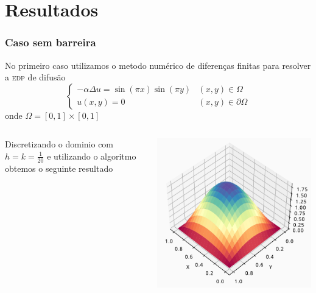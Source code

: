 \documentclass[xcolor=dvipsnames, aspectratio=169]{beamer}
\begin{document}
    \section{Resultados}
    \begin{frame}
        \frametitle{Caso sem barreira}

        No primeiro caso utilizamos o metodo numérico de diferenças finitas para resolver a \textsc{edp} de difusão
        \[
            \left\{ 
                \begin{array}{ll}
                    -\alpha \Delta u = \sin (\pi x) \sin (\pi y) & (x,y) \in \Omega\\
                    u(x,y) = 0 & (x,y) \in \partial \Omega
                \end{array}
            \right.
        \]
        onde $\Omega = [0,1] \times [0,1]$
    \end{frame}
    \begin{frame}
        \begin{columns}
            \begin{column}{0.4\textwidth}
                Discretizando o dominio com $h = k = \frac{1}{20}$ e utilizando o algoritmo obtemos o seguinte resultado
            \end{column}
            \begin{column}{0.6\textwidth}
                \begin{center}
                    \includegraphics[width=\columnwidth]{../../difusão.pdf}
                \end{center}
            \end{column}
        \end{columns}
    \end{frame}
\end{document}
